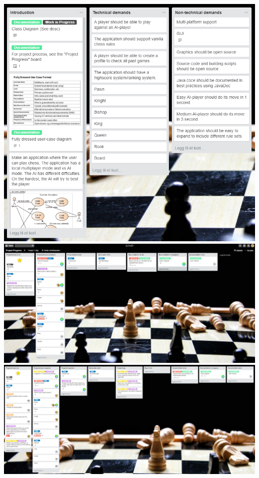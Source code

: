 \documentclass{article}
\begin{document}
\maketitle
\includegraphics[width=16cm]{main.png} \\
\includegraphics[width=16cm]{sc1.png} \\
\includegraphics[width=16cm]{sc2.png} \\
\end{document}
